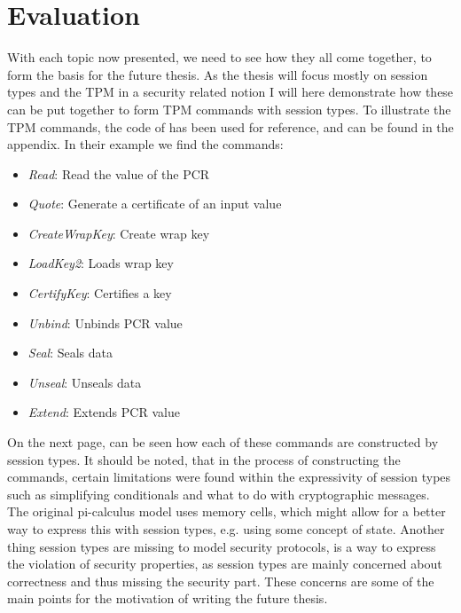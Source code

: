\newpage
\iffalse
For the evaluation section I would start by saying what you have been forced to do:
Remove all cryptographic messages and simplify stuff, like equality checks. Also the original pi-calculus model uses memory cells, and maybe there?s a better way to express this with a session type, for example using some concept of state.
Another thing that?s missing on the session type is a way to express the violation of a security property (session types are mainly concerned about correctness, but here we want to use them for security, so that?s something missing).
 \fi
\section{Evaluation}
With each topic now presented, we need to see how they all come together, to form the basis for the future thesis. As the thesis will focus mostly on session types and the TPM in a security related notion I will here demonstrate how these can be put together to form TPM commands with session types. To illustrate the TPM commands, the code of \citeauthor{DBLP:conf/csfw/DelauneKRS11} has been used for reference, and can be found in the appendix. In their example we find the commands:
\begin{spacing}{1}
\begin{itemize}
	\item \textit{Read}: Read the value of the PCR
	\item \textit{Quote}: Generate a certificate of an input value
	\item \textit{CreateWrapKey}: Create wrap key
	\item \textit{LoadKey2}: Loads wrap key
	\item \textit{CertifyKey}: Certifies a key
	\item \textit{Unbind}: Unbinds PCR value
	\item \textit{Seal}: Seals data
	\item \textit{Unseal}: Unseals data
	\item \textit{Extend}: Extends PCR value
\end{itemize}
\end{spacing}
\noindent On the next page, can be seen how each of these commands are constructed by session types. It should be noted, that in the process of constructing the commands, certain limitations were found within the expressivity of session types such as simplifying conditionals and what to do with cryptographic messages. The original pi-calculus model uses memory cells, which might allow for a better way to express this with session types, e.g. using some concept of state. Another thing session types are missing to model security protocols, is a way to express the violation of security properties, as session types are mainly concerned about correctness and thus missing the security part. These concerns are some of the main points for the motivation of writing the future thesis. 
